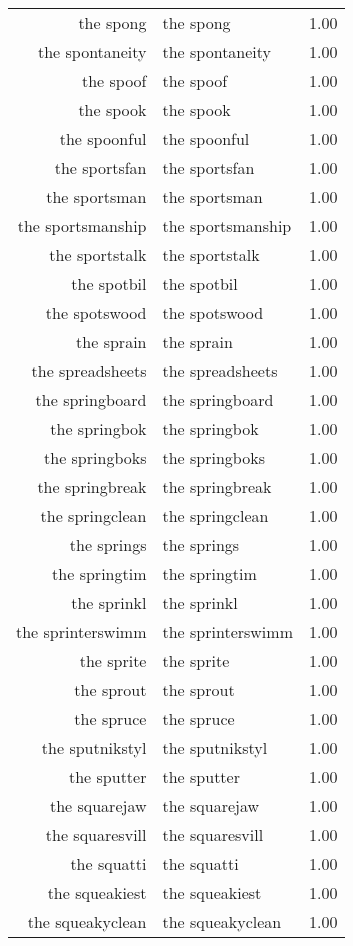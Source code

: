 \begin{table}[ht]
\begin{tabular}{rlr}
  the spong & the spong & 1.00 \\ 
  the spontaneity & the spontaneity & 1.00 \\ 
  the spoof & the spoof & 1.00 \\ 
  the spook & the spook & 1.00 \\ 
  the spoonful & the spoonful & 1.00 \\ 
  the sportsfan & the sportsfan & 1.00 \\ 
  the sportsman & the sportsman & 1.00 \\ 
  the sportsmanship & the sportsmanship & 1.00 \\ 
  the sportstalk & the sportstalk & 1.00 \\ 
  the spotbil & the spotbil & 1.00 \\ 
  the spotswood & the spotswood & 1.00 \\ 
  the sprain & the sprain & 1.00 \\ 
  the spreadsheets & the spreadsheets & 1.00 \\ 
  the springboard & the springboard & 1.00 \\ 
  the springbok & the springbok & 1.00 \\ 
  the springboks & the springboks & 1.00 \\ 
  the springbreak & the springbreak & 1.00 \\ 
  the springclean & the springclean & 1.00 \\ 
  the springs & the springs & 1.00 \\ 
  the springtim & the springtim & 1.00 \\ 
  the sprinkl & the sprinkl & 1.00 \\ 
  the sprinterswimm & the sprinterswimm & 1.00 \\ 
  the sprite & the sprite & 1.00 \\ 
  the sprout & the sprout & 1.00 \\ 
  the spruce & the spruce & 1.00 \\ 
  the sputnikstyl & the sputnikstyl & 1.00 \\ 
  the sputter & the sputter & 1.00 \\ 
  the squarejaw & the squarejaw & 1.00 \\ 
  the squaresvill & the squaresvill & 1.00 \\ 
  the squatti & the squatti & 1.00 \\ 
  the squeakiest & the squeakiest & 1.00 \\ 
  the squeakyclean & the squeakyclean & 1.00 \\ 

\end{tabular}
\end{table}
